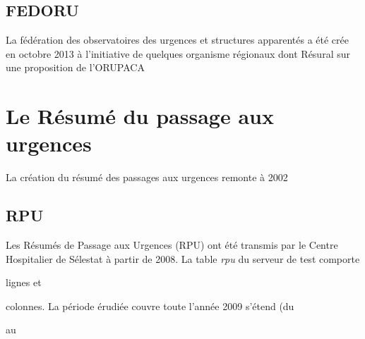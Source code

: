 \documentclass[12pt,english,french,twoside]{report}\usepackage[]{graphicx}\usepackage[]{color}
\begin{document}
\section*{FEDORU}
  
La fédération des observatoires des urgences et structures apparentés a été crée en octobre 2013 à l'initiative de quelques organisme régionaux dont Résural sur une proposition de l'ORUPACA 

  
\chapter{Le Résumé du passage aux urgences}


La création du résumé des passages aux urgences remonte à 2002 \cite{11}

\section*{RPU}

Les Résumés de Passage aux Urgences (RPU) ont été transmis par le Centre Hospitalier de Sélestat à partir de 2008. 
La table \emph{rpu} du serveur de test comporte 

{\ttfamily\noindent\bfseries\color{errorcolor}{\\Error in nrow(d2) : objet 'd2' introuvable}} lignes et 

{\ttfamily\noindent\bfseries\color{errorcolor}{\\Error in ncol(d2) : objet 'd2' introuvable}} colonnes. La période érudiée couvre toute l'année 2009 s'étend (du 

{\ttfamily\noindent\bfseries\color{errorcolor}{\\Error in eval(expr, envir, enclos) : objet 'd2' introuvable}} au 
\end{document}
